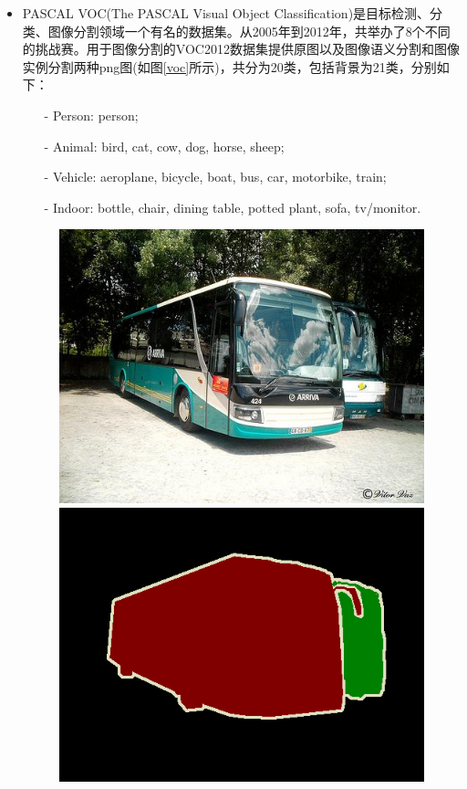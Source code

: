 \documentclass[cn]{elegantbook}
\begin{document}
\begin{itemize}
	\item PASCAL VOC(The PASCAL Visual Object Classification)是目标检测、分类、图像分割领域一个有名的数据集。从2005年到2012年，共举办了8个不同的挑战赛。用于图像分割的VOC2012数据集提供原图以及图像语义分割和图像实例分割两种png图(如图\ref{voc}所示)，共分为20类，包括背景为21类，分别如下：
	\begin{itemize}
		\item[-] Person: person;
		\item[-] Animal: bird, cat, cow, dog, horse, sheep;
		\item[-] Vehicle: aeroplane, bicycle, boat, bus, car, motorbike, train;
		\item[-] Indoor: bottle, chair, dining table, potted plant, sofa, tv/monitor.
	\end{itemize}
    \begin{figure}[!h]
    	\centering
    	\begin{minipage}[t]{0.32\textwidth}
    		\centering
    		\includegraphics[width=\textwidth]{images/voc1}
    	\end{minipage}
    	\begin{minipage}[t]{0.32\textwidth}
    		\centering
    		\includegraphics[width=\textwidth]{images/voc1_object.png}

\end{minipage}
\end{figure}
\end{itemize}
\end{document}

